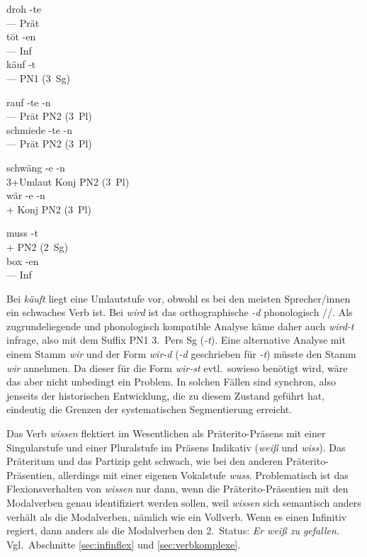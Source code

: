 \begin{exe}
\begin{xlist}
    \ex\gll droh -te\\
    --- Prät\\
    \ex\gll töt -en\\
    --- Inf\\
    \ex\gll käuf -t\\
    --- {PN1 (3~Sg)}\\
  \end{xlist}
  \ex
  \begin{xlist}
    \ex\gll rauf -te -n\\
    --- Prät {PN2 (3~Pl)}\\
    \ex\gll schmiede -te -n\\
    --- Prät {PN2 (3~Pl)}\\
  \end{xlist}
  \ex
  \begin{xlist}
    \ex\gll schwäng -e -n\\
    3+Umlaut Konj {PN2 (3~Pl)}\\
    \ex\gll wär -e -n\\
    $+$ Konj {PN2 (3~Pl)}\\
  \end{xlist}
  \ex
  \begin{xlist}
    \ex\gll muss -t\\
    $+$ {PN2 (2~Sg)}\\
    \ex\gll box -en\\
    --- Inf\\
  \end{xlist}
\end{exe}

Bei \textit{käuft} liegt eine Umlautstufe vor, obwohl es bei den meisten Sprecher\slash innen ein schwaches Verb ist.
Bei \textit{wird} ist das orthographische \textit{-d} phonologisch //.
Als zugrundeliegende und phonologisch kompatible Analyse käme daher auch \textit{wird-t} infrage, also mit dem Suffix PN1 3.~Pers Sg (\textit{-t}).
Eine alternative Analyse mit einem Stamm \textit{wir} und der Form \textit{wir-d} (\textit{-d} geschrieben für \textit{-t}) müsste den Stamm \textit{wir} annehmen.
Da dieser für die Form \textit{wir-st} evtl.\ sowieso benötigt wird, wäre das aber nicht unbedingt ein Problem.
In solchen Fällen sind synchron, also jenseits der historischen Entwicklung, die zu diesem Zustand geführt hat, eindeutig die Grenzen der systematischen Segmentierung erreicht.


Das Verb \textit{wissen} flektiert im Wesentlichen als Präterito-Präsens mit einer Singularstufe und einer Pluralstufe im Präsens Indikativ (\textit{weiß} und \textit{wiss}).
Das Präteritum und das Partizip geht schwach, wie bei den anderen Präterito-Präsentien, allerdings mit einer eigenen Vokalstufe \textit{wuss}.
Problematisch ist das Flexionsverhalten von \textit{wissen} nur dann, wenn die Präterito-Präsentien mit den Modalverben genau identifiziert werden sollen, weil \textit{wissen} sich semantisch anders verhält als die Modalverben, nämlich wie ein Vollverb.
Wenn es einen Infinitiv regiert, dann anders als die Modalverben den 2.~Status: \textit{Er weiß zu gefallen.}
Vgl.\ Abschnitte \ref{sec:infinflex} und \ref{sec:verbkomplexe}.

